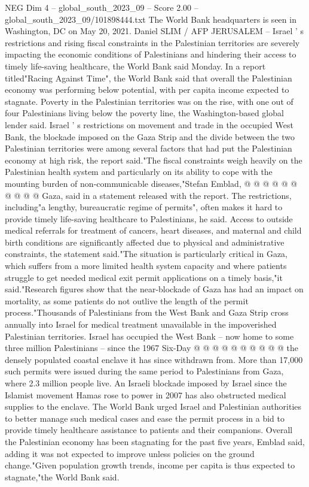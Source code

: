 \begin{textsample}{NEG Dim 4 – global\_south\_2023\_09 – Score 2.00 – global\_south\_2023\_09/101898444.txt}  \label{ex:f4_neg_025}
The World Bank headquarters is seen in Washington, DC on May 20, 2021.
Daniel SLIM / AFP JERUSALEM -- Israel ' s restrictions and rising fiscal constraints in the Palestinian territories are severely impacting the economic conditions of Palestinians and hindering their access to timely life-saving healthcare, the World Bank said Monday.
In a report titled"Racing Against Time", the World Bank said that overall the Palestinian economy was performing below potential, with per capita income expected to stagnate.
Poverty in the Palestinian territories was on the rise, with one out of four Palestinians living below the poverty line, the Washington-based global lender said.
Israel ' s restrictions on movement and trade in the occupied West Bank, the blockade imposed on the Gaza Strip and the divide between the two Palestinian territories were among several factors that had put the Palestinian economy at high risk, the report said."The fiscal constraints weigh heavily on the Palestinian health system and particularly on its ability to cope with the mounting burden of non-communicable diseases,"Stefan Emblad, @ @ @ @ @ @ @ @ @ @ Gaza, said in a statement released with the report.
The restrictions, including"a lengthy, bureaucratic regime of permits", often makes it hard to provide timely life-saving healthcare to Palestinians, he said.
Access to outside medical referrals for treatment of cancers, heart diseases, and maternal and child birth conditions are significantly affected due to physical and administrative constraints, the statement said."The situation is particularly critical in Gaza, which suffers from a more limited health system capacity and where patients struggle to get needed medical exit permit applications on a timely basis,"it said."Research figures show that the near-blockade of Gaza has had an impact on mortality, as some patients do not outlive the length of the permit process."Thousands of Palestinians from the West Bank and Gaza Strip cross annually into Israel for medical treatment unavailable in the impoverished Palestinian territories.
Israel has occupied the West Bank -- now home to some three million Palestinians -- since the 1967 Six-Day @ @ @ @ @ @ @ @ @ @ the densely populated coastal enclave it has since withdrawn from.
More than 17,000 such permits were issued during the same period to Palestinians from Gaza, where 2.3 million people live.
An Israeli blockade imposed by Israel since the Islamist movement Hamas rose to power in 2007 has also obstructed medical supplies to the enclave.
The World Bank urged Israel and Palestinian authorities to better manage such medical cases and ease the permit process in a bid to provide timely healthcare assistance to patients and their companions.
Overall the Palestinian economy has been stagnating for the past five years, Emblad said, adding it was not expected to improve unless policies on the ground change."Given population growth trends, income per capita is thus expected to stagnate,"the World Bank said.

\end{textsample}
